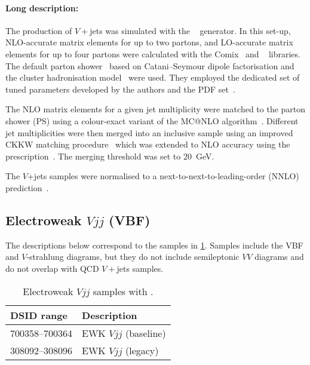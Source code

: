 \paragraph{Long description:}

The production of \(V+\)jets was simulated with the \SHERPA[2.2.1]~\cite{Bothmann:2019yzt}
generator. In this set-up, NLO-accurate matrix elements for up to two partons, and LO-accurate matrix elements for up
to four partons were calculated with the Comix~\cite{Gleisberg:2008fv} and
\OPENLOOPS~\cite{Buccioni:2019sur,Cascioli:2011va,Denner:2016kdg} libraries.
The default \SHERPA parton shower~\cite{Schumann:2007mg} based on
Catani--Seymour dipole factorisation and the cluster hadronisation model~\cite{Winter:2003tt}
were used. They employed the dedicated set of tuned parameters developed by the
\SHERPA authors and the \NNPDF[3.0nnlo] PDF set~\cite{Ball:2014uwa}.

The NLO matrix elements for a given jet multiplicity were matched to the parton
shower (PS) using a colour-exact variant of the MC@NLO
algorithm~\cite{Hoeche:2011fd}. Different jet multiplicities were then merged
into an inclusive sample using an improved CKKW matching
procedure~\cite{Catani:2001cc,Hoeche:2009rj} which was extended to NLO
accuracy using the \MEPSatNLO prescription~\cite{Hoeche:2012yf}. The merging threshold
was set to \SI{20}{\GeV}.



The \(V\)+jets samples were normalised to a next-to-next-to-leading-order (NNLO)
prediction~\cite{Anastasiou:2003ds}.


\subsection{Electroweak \(Vjj\) (VBF)}

The descriptions below correspond to the samples in
\cref{tab:ewkvjets-sherpa}.  Samples include the VBF and \(V\)-strahlung diagrams, but
they do not include semileptonic \(VV\) diagrams and do not overlap with QCD \(V+\)jets samples.

\begin{table}[!htbp]
  \caption{Electroweak \(Vjj\) samples with \SHERPA.}%
  \label{tab:ewkvjets-sherpa}
  \centering
  \begin{tabular}{l l}
    \toprule
    DSID range & Description \\
    \midrule
    700358--700364 & EWK \(Vjj\) (baseline) \\
    308092--308096 & EWK \(Vjj\) (legacy) \\
    \bottomrule
  \end{tabular}
\end{table}

